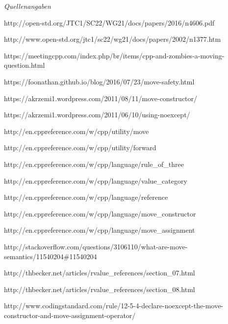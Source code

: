 \documentclass{article}
\begin{document}
\vspace{12pt}
\emph{Quellenangaben}

http://open-std.org/JTC1/SC22/WG21/docs/papers/2016/n4606.pdf

http://www.open-std.org/jtc1/sc22/wg21/docs/papers/2002/n1377.htm

https://meetingcpp.com/index.php/br/items/cpp-and-zombies-a-moving-question.html

https://foonathan.github.io/blog/2016/07/23/move-safety.html

https://akrzemi1.wordpress.com/2011/08/11/move-constructor/

https://akrzemi1.wordpress.com/2011/06/10/using-noexcept/

http://en.cppreference.com/w/cpp/utility/move

http://en.cppreference.com/w/cpp/utility/forward

http://en.cppreference.com/w/cpp/language/rule\_of\_three

http://en.cppreference.com/w/cpp/language/value\_category

http://en.cppreference.com/w/cpp/language/reference

http://en.cppreference.com/w/cpp/language/move\_constructor

http://en.cppreference.com/w/cpp/language/move\_assignment

http://stackoverflow.com/questions/3106110/what-are-move-semantics/11540204\#11540204

http://thbecker.net/articles/rvalue\_references/section\_07.html

http://thbecker.net/articles/rvalue\_references/section\_08.html

http://www.codingstandard.com/rule/12-5-4-declare-noexcept-the-move-constructor-and-move-assignment-operator/

\newpage
\end{document}
